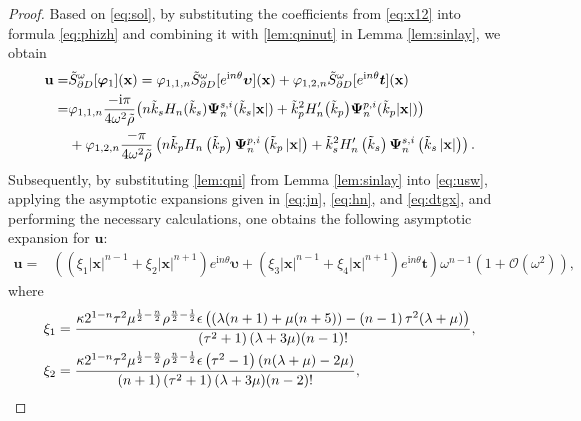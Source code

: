 \documentclass[10pt,a4paper]{amsart}
\newcommand{\bu}{\mathbf{u}}
\newcommand{\bx}{\mathbf{x}}
\begin{document}
\begin{proof}
	Based on \eqref{eq:sol}, by substituting the coefficients from \eqref{eq:x12} into formula \eqref{eq:phizh} and combining it with  \eqref{lem:qninut} in Lemma \ref{lem:sinlay}, we obtain
	\begin{align}
		\bu =&\tilde{S}_{\partial D }^{\omega }[\bm{\varphi} _{1} ] (\bx) 
		=\varphi _{1,1,n}\tilde{S}_{\partial D }^{\omega }[e^{\mathrm{i}n\theta }\bm{\upsilon}] (\bx)+\varphi _{1,2,n}\tilde{S}_{\partial D }^{\omega }[e^{\mathrm{i}n\theta }\bm{t}] (\bx) \label{eq:usw}\\
		=&\varphi _{1,1,n}\frac{-\mathrm{i}\pi}{4\omega^{2}\tilde{\rho} }\big(n\tilde{k}_{s}H_{n}(\tilde{k}_{s})\bm{\Psi}_{n}^{s,i}(\tilde{k}_{s}|\bx|)+\tilde{k}_{p}^{2}H_{n}^{\prime}\big(\tilde{k}_{p}\big)\bm{\Psi}_{n}^{p,i}(\tilde{k}_{p}|\mathbf{x}|)\big)\notag\\
		&+\varphi _{1,2,n}\frac{-\pi }{4\omega ^{2} \tilde{\rho}} \left ( n\tilde{k}_{p}H_{n}\left (\tilde{k}_{p} \right ) \bm{\Psi}_{n}^{p,i} \left (\tilde{k}_{p} \left | \bx \right |  \right ) +\tilde{k}_{s}^{2}  H_{n}'\left ( \tilde{k}_{s}  \right )  \bm{\Psi}_{n}^{s,i} \left (\tilde{k}_{s} \left | \bx \right |  \right ) \right ).\notag
	\end{align}
	Subsequently, by substituting  \eqref{lem:qni} from Lemma \ref{lem:sinlay} into \eqref{eq:usw}, applying the asymptotic expansions given in \eqref{eq:jn}, \eqref{eq:hn}, and \eqref{eq:dtgx}, and performing the necessary calculations, one obtains the following asymptotic expansion for $\bu$:
	\begin{align}\label{eq:uae}
		\bu
		=&\left(\left(\xi _1|\bx|^{n-1}+\xi_2|\bx|^{n+1}\right)e^{\mathrm{i}n\theta }\bm{\upsilon}+\left(\xi _3|\bx|^{n-1}+\xi_4|\bx|^{n+1}\right)e^{\mathrm{i}n\theta }\bm{t}\right)\omega ^{n-1}\left(1+\mathcal{O}\left(\omega^2\right)\right),
	\end{align}
	where
	\begin{align}
		\xi _1&=\frac{\kappa 2^{1-n} \tau ^2 \mu ^{\frac{1}{2}-\frac{n}{2}} \rho ^{\frac{n}{2}-\frac{1}{2}} \epsilon\left( (\lambda  (n+1)+\mu  (n+5))-\left(n-1\right) \tau ^2 (\lambda +\mu )\right)}{ \left(\tau ^2+1\right) (\lambda +3 \mu ) (n-1)!},\notag\\
		\xi _2&=\frac{\kappa 2^{1-n} \tau ^2 \mu ^{\frac{1}{2}-\frac{n}{2}} \rho ^{\frac{n}{2}-\frac{1}{2}} \epsilon  \left(\tau ^2-1\right)  (n (\lambda +\mu )-2 \mu )}{(n+1) \left(\tau ^2+1\right) (\lambda +3 \mu ) (n-2)!},\notag\\

\end{align}
\end{proof}
\end{document}
